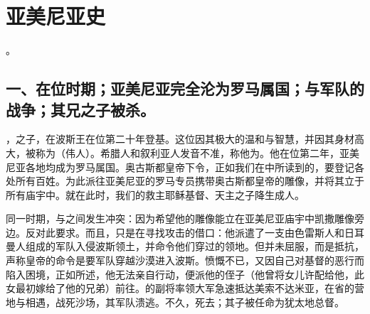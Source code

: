 
\chapter{亚美尼亚史}


。\par


\section{一、在位时期；亚美尼亚完全沦为罗马属国；与军队的战争；其兄之子被杀。}

，之子，在波斯王在位第二十年登基。这位因其极大的温和与智慧，并因其身材高大，被称为（伟人）。希腊人和叙利亚人发音不准，称他为。他在位第二年，亚美尼亚各地均成为罗马属国。奥古斯都皇帝下令，正如我们在中所读到的，要登记各处所有百姓。为此派往亚美尼亚的罗马专员携带奥古斯都皇帝的雕像，并将其立于所有庙宇中。就在此时，我们的救主耶稣基督、天主之子降生成人。\par

同一时期，与之间发生冲突：因为希望他的雕像能立在亚美尼亚庙宇中凯撒雕像旁边。反对此要求。而且，只是在寻找攻击的借口：他派遣了一支由色雷斯人和日耳曼人组成的军队入侵波斯领土，并命令他们穿过的领地。但并未屈服，而是抵抗，声称皇帝的命令是要军队穿越沙漠进入波斯。愤慨不已，又因自己对基督的恶行而陷入困境，正如所述，他无法亲自行动，便派他的侄子（他曾将女儿许配给他，此女最初嫁给了他的兄弟）前往。的副将率领大军急速抵达美索不达米亚，在省的营地与相遇，战死沙场，其军队溃逃。不久，死去；其子被任命为犹太地总督。\par


